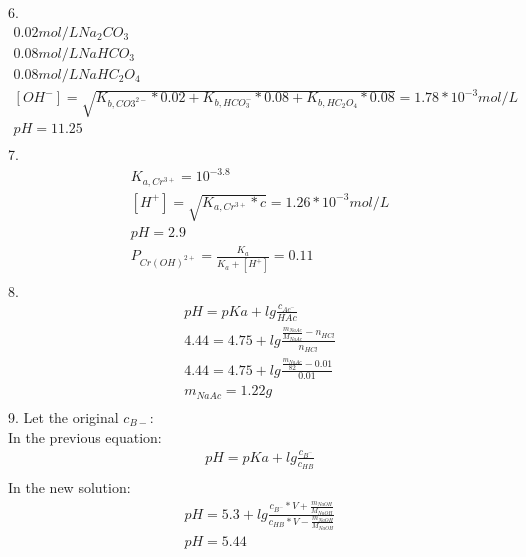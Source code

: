 \documentclass{article}
\begin{document}
6.\begin{equation}
    \begin{multlined}
        0.02 mol/L Na_2CO_3\\
        0.08 mol/L NaHCO_3\\
        0.08 mol/L NaHC_2O_4\\
        \left[OH^-\right] = \sqrt{K_{b,CO3^{2-}}*0.02 + K_{b,HCO_3^-}*0.08 + K_{b, HC_2O_4}*0.08} = 1.78*10^{-3} mol/L\\
        pH = 11.25\\
    \end{multlined}
\end{equation}
7. \begin{equation}
    \begin{multlined}
        K_{a, Cr^{3+}} = 10^{-3.8}\\
        \left[H^+\right] = \sqrt{K_{a,Cr^{3+}}* c} = 1.26*10^{-3}mol/L\\
        pH = 2.9\\
        P_{Cr\left(OH\right)^{2+}} = \frac{K_a}{K_a + \left[H^+\right]} = 0.11\\
    \end{multlined}
\end{equation}
8.
\begin{equation}
    \begin{multlined}
        pH = pKa + lg\frac{c_{Ac^-}}{HAc}\\
        4.44 = 4.75 + lg\frac{\frac{m_{NaAc}}{M_{NaAc}} - n_{HCl}}{n_{HCl}}\\
        4.44 = 4.75 + lg\frac{\frac{m_{NaAc}}{82} - 0.01}{0.01}\\
        m_{NaAc} = 1.22g\\
    \end{multlined}
\end{equation}
9. Let the original $c_{B-}$:\\
In the previous equation:\\
\begin{equation}
    \begin{multlined}
        pH = pKa + lg\frac{c_{B^-}}{c_{HB}}\\
    \end{multlined}
\end{equation}
In the new solution:\\
\begin{equation}
    \begin{multlined}
        pH = 5.3 + lg\frac{c_{B^-}*V + \frac{m_{NaOH}}{M_{NaOH}}}{c_{HB}*V - \frac{m_{NaOH}}{M_{NaOH}}}\\
        pH = 5.44\\
    \end{multlined}
\end{equation}
\end{document}
